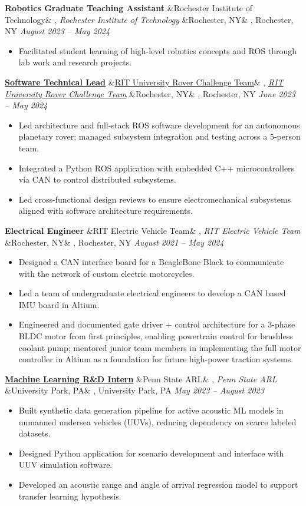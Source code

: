 \documentclass[letterpaper,10pt]{article}
\newcommand{\experience}[5]{%
    \noindent\textbf{#1}%
    \ifx&#2&
    \else
        , \textit{#2}%
    \fi
    \ifx&#3&
    \else
        , #3%
    \fi
    \hfill \textit{#4} \\
    \vspace{-6.8mm}%
    \begin{itemize}[itemsep=-5pt]
        \setlength{\itemindent}{0em}
        #5
    \end{itemize}
    \vspace{1mm}
}
\begin{document}
\experience
    {Robotics Graduate Teaching Assistant}
    {Rochester Institute of Technology}
    {Rochester, NY}
    {August 2023 – May 2024}
    {
        \item  Facilitated student learning of high-level robotics concepts and ROS through lab work and research projects.
    }

\experience
    {\href{https://ryanbarry.me/projects/robotics/rover/}{Software Technical Lead}}
    {\href{https://ryanbarry.me/projects/robotics/rover/}{RIT University Rover Challenge Team}}
    {Rochester, NY}
    {June 2023 – May 2024}
    {
        \item Led architecture and full-stack ROS software development for an autonomous planetary rover; managed subsystem integration and testing across a 5-person team.
        \item Integrated a Python ROS application with embedded C++ microcontrollers via CAN to control distributed subsystems.
        \item Led cross-functional design reviews to ensure electromechanical subsystems aligned with software architecture requirements.
    }

\experience
    {Electrical Engineer}
    {RIT Electric Vehicle Team}
    {Rochester, NY}
    {August 2021 – May 2024}
    {
        \item Designed a CAN interface board for a BeagleBone Black to communicate with the network of custom electric motorcycles.
        \item Led a team of undergraduate electrical engineers to develop a CAN based IMU board in Altium. 
        \item Engineered and documented gate driver + control architecture for a 3-phase BLDC motor from first principles, enabling powertrain control for brushless coolant pump; mentored junior team members in implementing the full motor controller in Altium as a foundation for future high-power traction systems.

    }

\experience
    {\href{https://ryanbarry.me/projects/ai-ml/sonar-data-pipeline/}{Machine Learning R\&D Intern}}
    {Penn State ARL}
    {University Park, PA}
    {May 2023 – August 2023}
    {
        \item Built synthetic data generation pipeline for active acoustic ML models in unmanned undersea vehicles (UUVs), reducing dependency on scarce labeled datasets.
        \item Designed Python application for scenario development and interface with UUV simulation software.
        \item Developed an acoustic range and angle of arrival regression model to support transfer learning hypothesis.
    }
\end{document}
